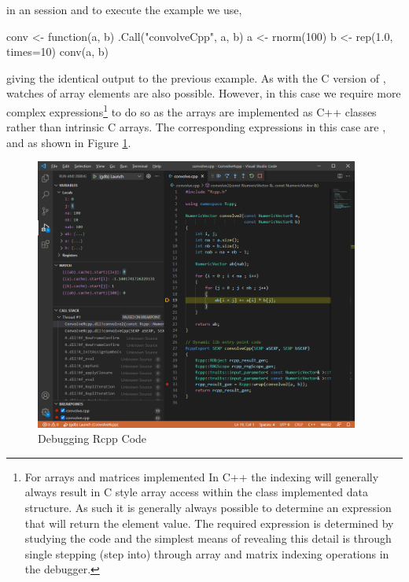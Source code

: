 in an  session and to execute the example we use,

\begin{Schunk}
  \begin{Sinput}
  conv <- function(a, b) .Call("convolveCpp", a, b)
  a <- rnorm(100)
  b <- rep(1.0, times=10)
  conv(a, b)
  \end{Sinput}
\end{Schunk}

giving the identical output to the previous example. As with the C version of , watches of 
array elements are also possible. However, in this case we require more complex expressions\footnote{For arrays and matrices implemented In 
C++ the indexing will generally always result in C style array access within the class implemented data structure. As such it is generally always
possible to determine an expression that will return the element value. The required expression is determined by studying the code and the simplest
means of revealing this detail is through single stepping (step into) through array and matrix indexing operations in the debugger.} to do so as the 
arrays are implemented as C++ classes rather than intrinsic C arrays. The corresponding expressions in this
case are ,  and  as 
shown in Figure \ref{fig:RcppDebug}.

\begin{Schunk}
  \begin{figure}[h]
  {\centering \includegraphics[width=0.95\textwidth]{RcppDebug} 

  }
  \caption[Debugging Rcpp Code]{Debugging Rcpp Code}\label{fig:RcppDebug}
  \end{figure}
\end{Schunk}

